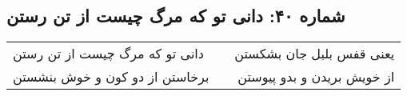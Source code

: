\begin{center}
\section*{شماره ۴۰: دانی تو که مرگ چیست از تن رستن}
\label{sec:040}
\begin{longtable}{l p{0.5cm} r}
دانی تو که مرگ چیست از تن رستن
&&
یعنی قفس بلبل جان بشکستن
\\
برخاستن از دو کون و خوش بنشستن
&&
از خویش بریدن و بدو پیوستن
\\
\end{longtable}
\end{center}
